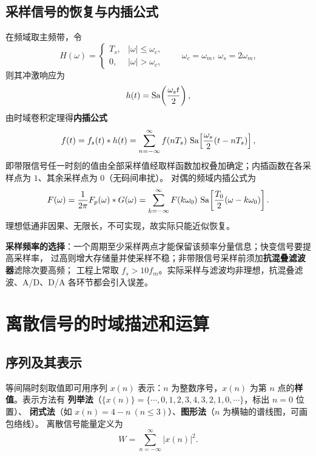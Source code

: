 \subsection{采样信号的恢复与内插公式}

在频域取主频带，令
\begin{equation}
H(\omega)=\begin{cases}T_s, & |\omega|\le\omega_c,\\ 0, & |\omega|>\omega_c,\end{cases}
\qquad \omega_c=\omega_m,\ \omega_s=2\omega_m,
\end{equation}
则其冲激响应为
\begin{equation}
h(t)=\operatorname{Sa}\!\left(\frac{\omega_s t}{2}\right),
\end{equation}
由时域卷积定理得\textbf{内插公式}
\begin{equation}
f(t)=f_s(t)*h(t)=\sum_{n=-\infty}^{\infty}f(nT_s)\,\operatorname{Sa}\!\left[\frac{\omega_s}{2}(t-nT_s)\right],
\end{equation}
即带限信号任一时刻的值由全部采样值经取样函数加权叠加确定；内插函数在各采样点为 $1$、其余采样点为 $0$（无码间串扰）。
对偶的频域内插公式为
\begin{equation}
F(\omega)=\frac{1}{2\pi}F_p(\omega)*G(\omega)
=\sum_{k=-\infty}^{\infty}F(k\omega_0)\,\operatorname{Sa}\!\left[\frac{T_0}{2}(\omega-k\omega_0)\right].
\end{equation}
理想低通非因果、无限长，不可实现，故实际只能近似恢复。

\textbf{采样频率的选择}：一个周期至少采样两点才能保留该频率分量信息；快变信号要提高采样率，
过高则增大存储量并使采样不稳；非带限信号采样前须加\textbf{抗混叠滤波器}滤除次要高频；
工程上常取 $f_s>10f_m$。实际采样与滤波均非理想，抗混叠滤波、A/D、D/A 各环节都会引入误差。

\section{离散信号的时域描述和运算}

\subsection{序列及其表示}

等间隔时刻取值即可用序列 $x(n)$ 表示：$n$ 为整数序号，$x(n)$ 为第 $n$ 点的\textbf{样值}。表示方法有
\textbf{列举法}（$\{x(n)\}=\{\cdots,0,1,2,3,4,3,2,1,0,\cdots\}$，标出 $n=0$ 位置）、
\textbf{闭式法}（如 $x(n)=4-n\ (n\le3)$）、\textbf{图形法}（$n$ 为横轴的谱线图，可画包络线）。
离散信号能量定义为
\begin{equation}
W=\sum_{n=-\infty}^{\infty}\big|x(n)\big|^2 .
\end{equation}

